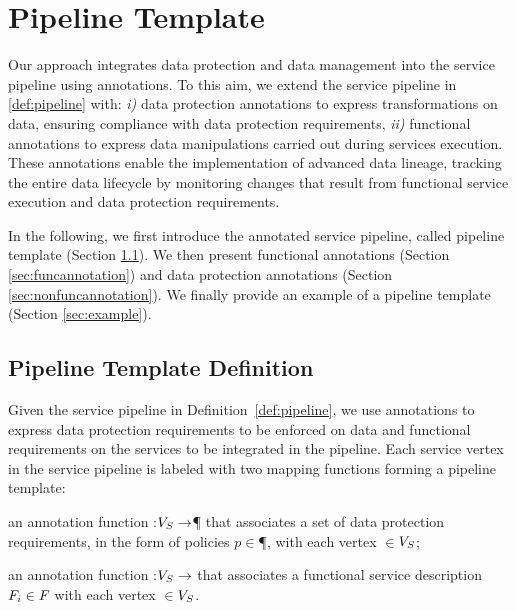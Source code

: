 \section{Pipeline Template}\label{sec:template}
Our approach integrates data protection and data management into the service pipeline using annotations.
To this aim, we extend the service pipeline in \cref{def:pipeline} with: \emph{i)} data protection annotations to express transformations on data, ensuring compliance with data protection requirements, \emph{ii)} functional annotations to express data manipulations carried out during services execution.
These annotations enable the implementation of advanced data lineage, tracking the entire data lifecycle by monitoring changes that result from functional service execution and data protection requirements.

In the following, we first introduce the annotated service pipeline, called pipeline template (Section \ref{sec:templatedefinition}). We then present functional annotations (Section \ref{sec:funcannotation}) and data protection annotations (Section \ref{sec:nonfuncannotation}). We finally provide an example of a pipeline template (Section \ref{sec:example}).


\subsection{Pipeline Template Definition}\label{sec:templatedefinition}
Given the service pipeline in Definition~\ref{def:pipeline}, we use annotations to express data protection requirements to be enforced on data and functional requirements on the services to be integrated in the pipeline. Each service vertex in the service pipeline is labeled with two mapping functions forming a pipeline template:
\begin{enumerate*}[label=\textit{\roman*})]
  \item an annotation function \myLambda:$V_S\rightarrow$\P{} that associates a set of data protection requirements, in the form of policies $p$$\in$\P{}, with each vertex $\in$$V_S$;
  \item an annotation function \myGamma:$V_S\rightarrow$\F{} that associates a functional service description $F_i\in F_{}$ with each vertex $\in$$V_S$.
\end{enumerate*}

